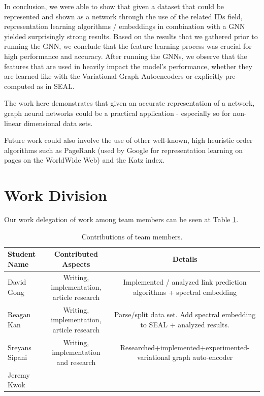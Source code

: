 \documentclass[10pt,twocolumn,letterpaper]{article}
\begin{document}
In conclusion, we were able to show that given a dataset that could be represented and shown as a network through the use of the related IDs field, representation learning algorithms / embeddings in combination with a GNN yielded surprisingly strong results. Based on the results that we gathered prior to running the GNN, we conclude that the feature learning process was crucial for high performance and accuracy. After running the GNNs, we observe that the features that are used in heavily impact the model's performance, whether they are learned like with the Variational Graph Autoencoders or explicitly pre-computed as in SEAL.

The work here demonstrates that given an accurate representation of a network, graph neural networks could be a practical application - especially so for non-linear dimensional data sets.

Future work could also involve the use of other well-known, high heuristic order algorithms such as PageRank (used by Google for representation learning on pages on the WorldWide Web) and the Katz index. 

\section{Work Division}

Our work delegation of work among team members can be seen at Table \ref{tab:contributions}.


\begin{table}
\begin{left}
\begin{tabular}{|l|c|c|}
\hline
Student Name & Contributed Aspects & Details \\
\hline\hline
David Gong & Writing, implementation, article research & Implemented / analyzed link prediction algorithms + spectral embedding \\
Reagan Kan & Writing, implementation, article research & Parse/split data set. Add spectral embedding to SEAL + analyzed results. \\
Sreyans Sipani & Writing, implementation and research & Researched+implemented+experimented-variational graph auto-encoder \\
Jeremy Kwok & & \\
\hline
\end{tabular}
\end{left}
\caption{Contributions of team members.}
\label{tab:contributions}
\end{table}
\end{document}
